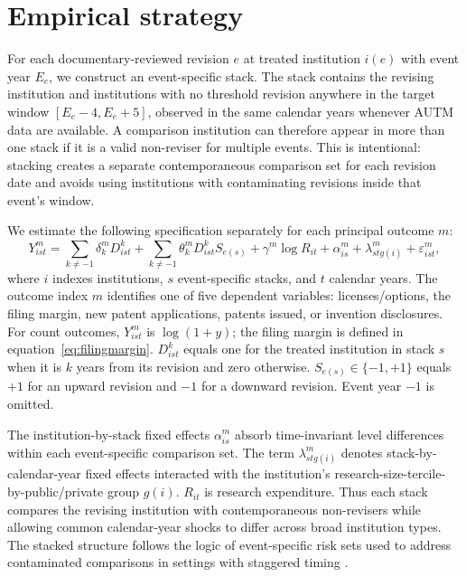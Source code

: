 \section{Empirical strategy}\label{sec:strategy}

For each documentary-reviewed revision $e$ at treated institution $i(e)$ with event year $E_e$, we construct an event-specific stack. The stack contains the revising institution and institutions with no threshold revision anywhere in the target window $[E_e-4,E_e+5]$, observed in the same calendar years whenever AUTM data are available. A comparison institution can therefore appear in more than one stack if it is a valid non-reviser for multiple events. This is intentional: stacking creates a separate contemporaneous comparison set for each revision date and avoids using institutions with contaminating revisions inside that event's window.

We estimate the following specification separately for each principal outcome $m$:
\begin{equation}
Y^{m}_{ist}
=
\sum_{k\neq-1}\delta^{m}_k D^k_{ist}
+
\sum_{k\neq-1}\theta^{m}_k D^k_{ist}S_{e(s)}
+
\gamma^{m}\log R_{it}
+
\alpha^{m}_{is}
+
\lambda^{m}_{stg(i)}
+
\varepsilon^{m}_{ist},
\label{eq:stacked}
\end{equation}
where $i$ indexes institutions, $s$ event-specific stacks, and $t$ calendar years. The outcome index $m$ identifies one of five dependent variables: licenses/options, the filing margin, new patent applications, patents issued, or invention disclosures. For count outcomes, $Y^{m}_{ist}$ is $\log(1+y)$; the filing margin is defined in equation~\eqref{eq:filingmargin}. $D^k_{ist}$ equals one for the treated institution in stack $s$ when it is $k$ years from its revision and zero otherwise. $S_{e(s)}\in\{-1,+1\}$ equals $+1$ for an upward revision and $-1$ for a downward revision. Event year $-1$ is omitted.

The institution-by-stack fixed effects $\alpha^{m}_{is}$ absorb time-invariant level differences within each event-specific comparison set. The term $\lambda^{m}_{stg(i)}$ denotes stack-by-calendar-year fixed effects interacted with the institution's research-size-tercile-by-public/private group $g(i)$. $R_{it}$ is research expenditure. Thus each stack compares the revising institution with contemporaneous non-revisers while allowing common calendar-year shocks to differ across broad institution types. The stacked structure follows the logic of event-specific risk sets used to address contaminated comparisons in settings with staggered timing \citep{GoodmanBacon2021,CallawaySantAnna2021,SunAbraham2021,CengizEtAl2019}.

